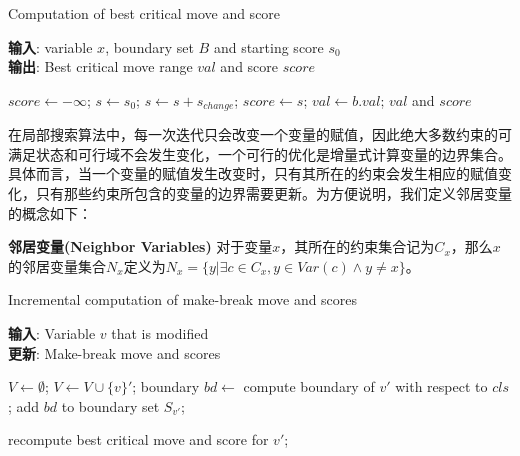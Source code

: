 \begin{algorithm}[t]
    \caption{Computation of best critical move and score}
    \label{alg:score}
    \textbf{输入}: variable $x$, boundary set $B$ and starting score $s_0$\\
    \textbf{输出}: Best critical move range $val$ and score $score$
    \begin{algorithmic}[1] %
        \Statex \hrulefill

        \State $score \leftarrow -\infty$;
        \State $s \leftarrow s_0$;
            \STATE $s \leftarrow s + s_{change}$;
                \STATE $score \leftarrow s$;
                \STATE $val \leftarrow b.val$;
            \ENDIF
        \ENDFOR
        \RETURN $val$ and $score$
    \end{algorithmic}
\end{algorithm}

在局部搜索算法中，每一次迭代只会改变一个变量的赋值，因此绝大多数约束的可满足状态和可行域不会发生变化，一个可行的优化是增量式计算变量的边界集合。具体而言，当一个变量的赋值发生改变时，只有其所在的约束会发生相应的赋值变化，只有那些约束所包含的变量的边界需要更新。为方便说明，我们定义邻居变量的概念如下：

\begin{definition}{\textbf{邻居变量(Neighbor Variables)}}
    对于变量$x$，其所在的约束集合记为$C_x$，那么$x$的邻居变量集合$N_x$定义为$N_x = \{y | \exists c \in C_x, y \in Var(c) \land y \neq x\}$。
\end{definition}

\begin{algorithm}[t]
    \caption{Incremental computation of make-break move and scores}
    \label{alg:update}
    \textbf{输入}: Variable $v$ that is modified\\
    \textbf{更新}: Make-break move and scores
    \begin{algorithmic}[1] %
        \Statex \hrulefill

        \State $V \leftarrow \emptyset$;
                \STATE $V \leftarrow V \cup \{v\}'$;
                \STATE boundary $bd \leftarrow $ compute boundary of $v'$ with respect to  $cls$;
                \STATE add $bd$ to boundary set $S_{v'}$;   
            \ENDFOR
        \ENDFOR

            \STATE recompute best critical move and score for $v'$; 
        \ENDFOR
    \end{algorithmic}
\end{algorithm}

